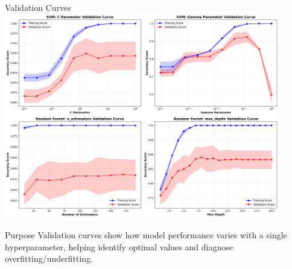 \documentclass[8pt,aspectratio=1610]{beamer}
\begin{document}
\begin{frame}{Validation Curves}
\centering
\includegraphics[width=0.9\textwidth]{../figures/validation_curves.png}

\vspace{0.3cm}

\begin{alertblock}{Purpose}
Validation curves show how model performance varies with a single hyperparameter, helping identify optimal values and diagnose overfitting/underfitting.
\end{alertblock}
\end{frame}
\end{document}

